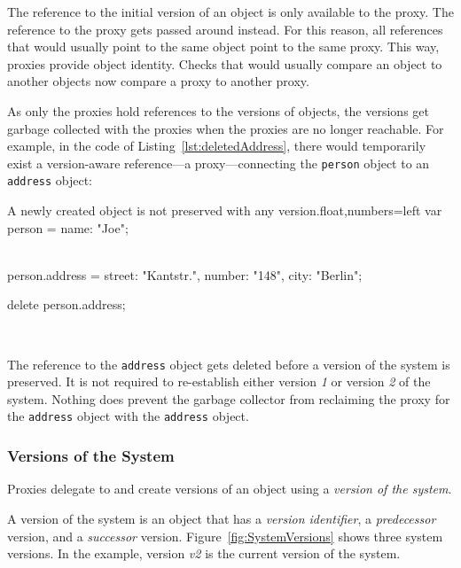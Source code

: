 The reference to the initial version of an object is only available to the proxy.
The reference to the proxy gets passed around instead.
For this reason, all references that would usually point to the same object point to the same proxy.
This way, proxies provide object identity.
Checks that would usually compare an object to another objects now compare a proxy to another proxy.

As only the proxies hold references to the versions of objects, the versions get garbage collected with the proxies when the proxies are no longer reachable.
For example, in the code of Listing~\ref{lst:deletedAddress}, there would temporarily exist a version-aware reference---a proxy---connecting the \lstinline{person} object to an \lstinline{address} object:

\begin{code}{A newly created object is not preserved with any version.}{float,numbers=left}
    var person = {name: "Joe"};
    
    \\ [preserve first version]
    
    person.address = {street: "Kantstr.",
                      number: "148",
                      city: "Berlin"};
    
    delete person.address;
    
    \\ [preserve second version]
\end{code}
\iffalse
\end{verbatim}\fi

The reference to the \lstinline{address} object gets deleted before a version of the system is preserved.
It is not required to re-establish either version \emph{1} or version \emph{2} of the system.
Nothing does prevent the garbage collector from reclaiming the proxy for the \lstinline{address} object with the \lstinline{address} object.


\subsubsection{Versions of the System}

Proxies delegate to and create versions of an object using a \emph{version of the system}.

A version of the system is an object that has a \emph{version identifier}, a \emph{predecessor} version, and a \emph{successor} version.
Figure~\ref{fig:SystemVersions} shows three system versions.
In the example, version \emph{v2} is the current version of the system.

